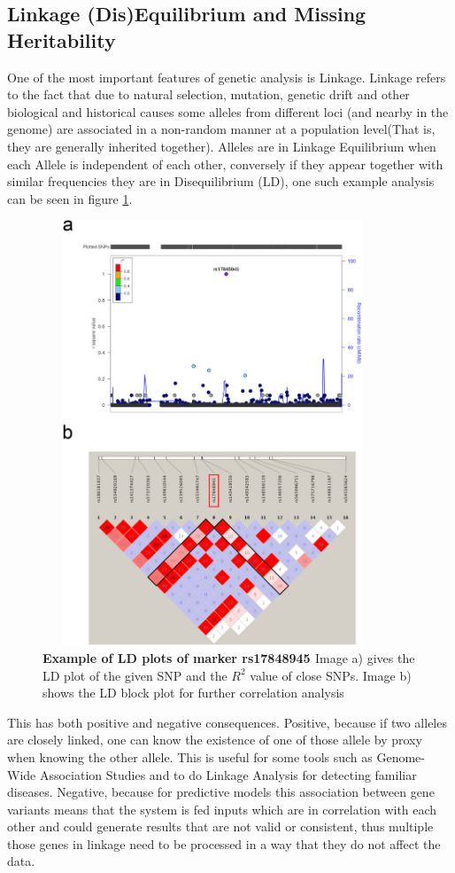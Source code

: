 \subsection{Linkage (Dis)Equilibrium and Missing Heritability}
\label{missHerit}
One of the most important features of genetic analysis is Linkage. Linkage refers to the fact that due to natural selection, mutation, genetic drift and other biological and historical causes some alleles from different loci (and nearby in the genome) are associated in a non-random manner at a population level(That is, they are generally inherited together). Alleles are in Linkage Equilibrium when each Allele is independent of each other, conversely if they appear together with similar frequencies they are in Disequilibrium (LD), one such example analysis can be seen in figure \ref{genfig3}.\cite{nussbaum_mcinnes_willard_2016}

\begin{figure}[!ht]
\centerline{\includegraphics[width=4in,height=5in]{images/background/ld.jpg}}
\caption{{\bf Example of LD plots of marker rs17848945 \cite{ldfig}} Image a) gives the LD plot of the given SNP and the $R^2$ value of close SNPs. Image b) shows the LD block plot for further correlation analysis}
\label{genfig3}
\end{figure}

This has both positive and negative consequences. Positive, because if two alleles are closely linked, one can know the existence of one of those allele by proxy when knowing the other allele. This is useful for some tools such as Genome-Wide Association Studies and to do Linkage Analysis for detecting familiar diseases. Negative, because for predictive models this association between gene variants means that the system is fed inputs which are in correlation with each other and could generate results that are not valid or consistent, thus multiple those genes in linkage need to be processed in a way that they do not affect the data.\cite{nussbaum_mcinnes_willard_2016}

